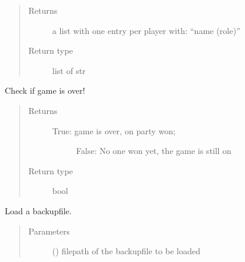 \documentclass[letterpaper,10pt,english]{sphinxmanual}
\begin{document}
\begin{fulllineitems}
\begin{fulllineitems}
\begin{quote}
\begin{description}
\item[{Returns}] \leavevmode
a list with one entry per player with: “name (role)”

\item[{Return type}] \leavevmode
list of str

\end{description}\end{quote}

\end{fulllineitems}


\begin{fulllineitems}
\label{\detokenize{chatwolf:chatwolf.game.Game.is_end}}
Check if game is over!
\begin{quote}\begin{description}
\item[{Returns}] \leavevmode
\begin{description}
\item[{True: game is over, on party won;}] \leavevmode
False: No one won yet, the game is still on

\end{description}


\item[{Return type}] \leavevmode
bool

\end{description}\end{quote}

\end{fulllineitems}


\begin{fulllineitems}
\label{\detokenize{chatwolf:chatwolf.game.Game.load_bkp}}
Load a backup\sphinxhyphen{}file.
\begin{quote}\begin{description}
\item[{Parameters}] \leavevmode
{} () \textendash{} filepath of the backup\sphinxhyphen{}file to be loaded


\end{description}
\end{quote}
\end{fulllineitems}
\end{fulllineitems}
\end{document}
